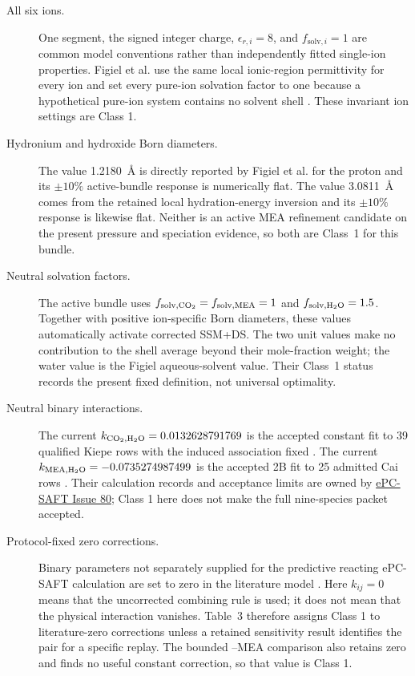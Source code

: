 \documentclass[10pt,oneside]{scrartcl}
\begin{document}
\begin{description}
\item[All six ions.] One segment, the signed integer charge,
$\epsilon_{r,i}=8$, and $f_{\mathrm{solv},i}=1$ are common model conventions
rather than independently fitted single-ion properties. Figiel et al. use the
same local ionic-region permittivity for every ion and set every pure-ion
solvation factor to one because a hypothetical pure-ion system contains no
solvent shell \cite{Figiel2025}. These invariant ion settings are Class 1.

\item[Hydronium and hydroxide Born diameters.] The
 value \SI{1.2180}{\angstrom} is directly reported by Figiel et al.
for the proton and its $\pm10\%$ active-bundle response is numerically flat.
The  value \SI{3.0811}{\angstrom} comes from the retained local
hydration-energy inversion and its $\pm10\%$ response is likewise flat.
Neither is an active MEA refinement candidate on the present pressure and
speciation evidence, so both are Class~1 for this bundle.

\item[Neutral solvation factors.] The active bundle uses
$f_{\mathrm{solv},\ce{CO2}}=f_{\mathrm{solv},\ce{MEA}}=1$ and
$f_{\mathrm{solv},\ce{H2O}}=1.5$. Together with positive ion-specific Born
diameters, these values automatically activate corrected SSM+DS. The two unit
values make no contribution to the shell average beyond their mole-fraction
weight; the water value is the Figiel aqueous-solvent value. Their Class~1
status records the present fixed definition, not universal optimality.

\item[Neutral binary interactions.] The current
$k_{\ce{CO2},\ce{H2O}}=0.0132628791769$ is the accepted constant fit to 39
qualified Kiepe rows with the induced association fixed
\cite{kiepeExperimentalDeterminationPrediction2002}. The current
$k_{\mathrm{MEA},\ce{H2O}}=-0.0735274987499$ is the accepted 2B fit to 25
admitted Cai rows \cite{caiBinaryIsobaricVaporLiquid1996}. Their calculation
records and acceptance limits are owned by
\href{https://github.com/tannerpolley/ePC-SAFT/issues/80}{ePC-SAFT Issue 80};
Class 1 here does not make the full nine-species packet accepted.

\item[Protocol-fixed zero corrections.] Binary parameters not separately
supplied for the predictive reacting ePC-SAFT calculation are set to zero in
the literature model \cite{Uyan2015}. Here $k_{ij}=0$ means that the
uncorrected combining rule is used; it does not mean that the physical
interaction vanishes. Table~3 therefore assigns Class 1 to literature-zero
corrections unless a retained sensitivity result identifies the pair for a
specific replay. The bounded --MEA comparison also retains zero and
finds no useful constant correction, so that value is Class 1.
\end{description}
\end{document}
